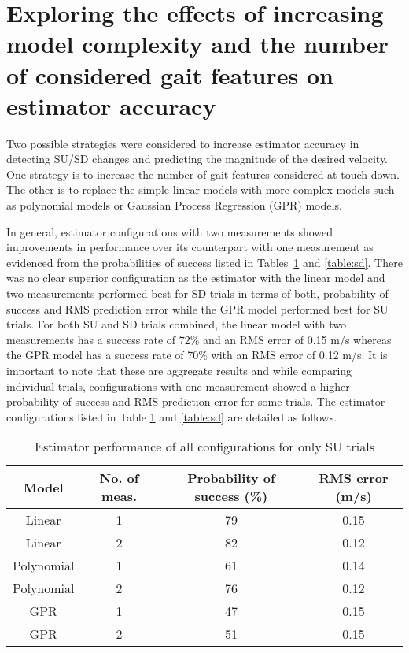 \section{Exploring the effects of increasing model complexity and the number of considered gait features on estimator accuracy}

Two possible strategies were considered to increase estimator accuracy in detecting SU/SD changes and predicting the magnitude of the desired velocity. One strategy is to increase the number of gait features considered at touch down. The other is to replace the simple linear models with more complex models such as polynomial models or Gaussian Process Regression (GPR) models.

In general, estimator configurations with two measurements showed improvements in performance over its counterpart with one measurement as evidenced from the probabilities of success listed in Tables~\ref{table:su} and \ref{table:sd}. There was no clear superior configuration as the estimator with the linear model and two measurements performed best for SD trials in terms of both, probability of success and RMS prediction error while the GPR model performed best for SU trials. For both SU and SD trials combined, the linear model with two measurements has a success rate of 72\% and an RMS error of 0.15 m/s whereas the GPR model has a success rate of 70\% with an RMS error of 0.12 m/s. It is important to note that these are aggregate results and while comparing individual trials, configurations with one measurement showed a higher probability of success and RMS prediction error for some trials. The estimator configurations listed in Table \ref{table:su} and \ref{table:sd} are detailed as follows.

\begin{table} %
	\centering
	\caption{Estimator performance of all configurations for only SU trials} \label{table:su}
	\small
	\begin{tabular}{|c|c|c|c|}
		\hline
		Model & No. of meas. & Probability of success (\%) & RMS error (m/s)\\
		\hline
		Linear & 1 & 79 & 0.15 \\
		\hline
		Linear & 2 & 82 & 0.12 \\
		\hline
		Polynomial & 1 & 61 & 0.14 \\
		\hline
		Polynomial & 2 & 76 & 0.12 \\
		\hline
		GPR & 1 & 47 & 0.15 \\
		\hline
		GPR & 2 & 51 & 0.15 \\
		\hline
	\end{tabular}
\end{table}

